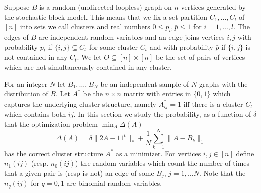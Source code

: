 \documentclass[12pt]{amsart}
\theoremstyle{remark}
\begin{document}
Suppose $B$ is a random (undirected loopless) graph on $n$ vertices generated by the stochastic block model. This means that we fix a set partition $C_1,\dots, C_l$ of $[n]$ into sets we call clusters and real numbers $0\leq p_i,\bar{p}\leq 1$ for $i=1,\dots, l$. The edges of $B$ are independent random variables and an edge joins vertices $i,j$ with probability $p_t$ if $\{i,j\}\subseteq C_t$ for some cluster $C_t$ and with probability $\bar{p}$ if $\{i,j\}$ is not contained in any $C_t$. We let $O\subseteq [n]\times [n]$ be the set of pairs of vertices which are not simultaneously contained in any cluster. 

For an integer $N$ let $B_1,\dots, B_N$ be an independent sample of $N$ graphs with the distribution of $B$. Let $A^*$ be the $n\times n$ matrix with entries in $\{0,1\}$ which captures the underlying cluster structure, namely $A^*_{ij}=1$ iff there is a cluster $C_t$ which contains both $ij$. In this section we study the probability, as a function of $\delta$ that the optimization problem $\min_A\Delta(A)$
\[\Delta(A)= \delta\|2A-11^t\|_{*}+\frac{1}{N}\sum_{k=1}^N\|A-B_k\|_1\] 
has the correct cluster structure $A^*$ as a minimizer. For vertices $i,j\in [n]$ define $n_1(ij)$ (resp. $n_0(ij)$) the random variables which count the number of times that a given pair is (resp is not) an edge of some $B_j$, $j=1,\dots N$. Note that the $n_q(ij)$ for $q=0,1$ are binomial random variables.  
\end{document}
